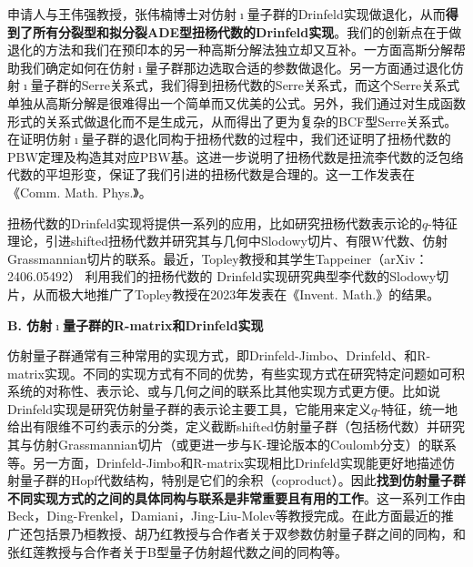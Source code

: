 \documentclass[12pt,UTF8,AutoFakeBold=4,a4paper]{ctexart}
\begin{document}

申请人与王伟强教授，张伟楠博士对仿射$\imath$量子群的Drinfeld实现做退化，从而\textbf{得到了所有分裂型和拟分裂ADE型扭杨代数的Drinfeld实现}。我们的创新点在于做退化的方法和我们在预印本的另一种高斯分解法独立却又互补。一方面高斯分解帮助我们确定如何在仿射$\imath$量子群那边选取合适的参数做退化。另一方面通过退化仿射$\imath$量子群的Serre关系式，我们得到扭杨代数的Serre关系式，而这个Serre关系式单独从高斯分解是很难得出一个简单而又优美的公式。另外，我们通过对生成函数形式的关系式做退化而不是生成元，从而得出了更为复杂的BCF型Serre关系式。在证明仿射$\imath$量子群的退化同构于扭杨代数的过程中，我们还证明了扭杨代数的PBW定理及构造其对应PBW基。这进一步说明了扭杨代数是扭流李代数的泛包络代数的平坦形变，保证了我们引进的扭杨代数是合理的。这一工作发表在《Comm. Math. Phys.》。

扭杨代数的Drinfeld实现将提供一系列的应用，比如研究扭杨代数表示论的$q$-特征理论，引进shifted扭杨代数并研究其与几何中Slodowy切片、有限W代数、仿射Grassmannian切片的联系。最近，Topley教授和其学生Tappeiner（arXiv：2406.05492） 利用我们的扭杨代数的 Drinfeld实现研究典型李代数的Slodowy切片，从而极大地推广了Topley教授在2023年发表在《Invent. Math.》的结果。


\textbf{B. 仿射$\imath$量子群的R-matrix和Drinfeld实现} 

仿射量子群通常有三种常用的实现方式，即Drinfeld-Jimbo、Drinfeld、和R-matrix实现。不同的实现方式有不同的优势，有些实现方式在研究特定问题如可积系统的对称性、表示论、或与几何之间的联系比其他实现方式更方便。比如说Drinfeld实现是研究仿射量子群的表示论主要工具，它能用来定义$q$-特征，统一地给出有限维不可约表示的分类，定义截断shifted仿射量子群（包括杨代数）并研究其与仿射Grassmannian切片（或更进一步与K-理论版本的Coulomb分支）的联系等。另一方面，Drinfeld-Jimbo和R-matrix实现相比Drinfeld实现能更好地描述仿射量子群的Hopf代数结构，特别是它们的余积（coproduct）。因此\textbf{找到仿射量子群不同实现方式的之间的具体同构与联系是非常重要且有用的工作}。这一系列工作由Beck，Ding-Frenkel，Damiani，Jing-Liu-Molev等教授完成。在此方面最近的推广还包括景乃桓教授、胡乃红教授与合作者关于双参数仿射量子群之间的同构，和张红莲教授与合作者关于B型量子仿射超代数之间的同构等。
\end{document}
